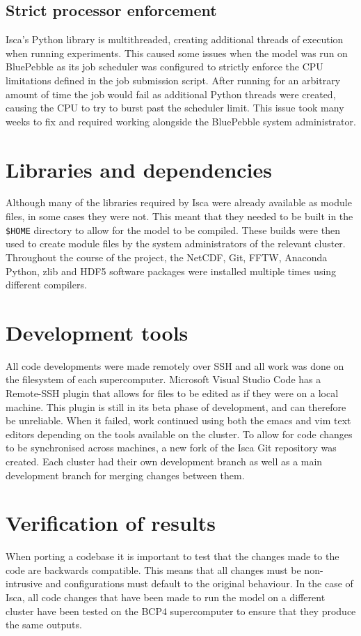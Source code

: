\documentclass[a4paper,11pt]{report}
\begin{document}
\subsection{Strict processor enforcement}
Isca's Python library is multithreaded, creating additional threads of execution when running experiments. This caused some issues when the model was run on BluePebble as its job scheduler was configured to strictly enforce the CPU limitations defined in the job submission script. After running for an arbitrary amount of time the job would fail as additional Python threads were created, causing the CPU to try to burst past the scheduler limit. This issue took many weeks to fix and required working alongside the BluePebble system administrator. 



\section{Libraries and dependencies}
Although many of the libraries required by Isca were already available as module files, in some cases they were not. This meant that they needed to be built in the \texttt{\$HOME} directory to allow for the model to be compiled. These builds were then used to create module files by the system administrators of the relevant cluster. Throughout the course of the project, the NetCDF, Git, FFTW, Anaconda Python, zlib and HDF5 software packages were installed multiple times using different compilers. 

\section{Development tools}
All code developments were made remotely over SSH and all work was done on the filesystem of each supercomputer. Microsoft Visual Studio Code has a Remote-SSH plugin that allows for files to be edited as if they were on a local machine. This plugin is still in its beta phase of development, and can therefore be unreliable. When it failed, work continued using both the emacs and vim text editors depending on the tools available on the cluster. To allow for code changes to be synchronised across machines, a new fork of the Isca Git repository was created. Each cluster had their own development branch as well as a main development branch for merging changes between them. 



\section{Verification of results}
When porting a codebase it is important to test that the changes made to the code are backwards compatible. This means that all changes must be non-intrusive and configurations must default to the original behaviour. In the case of Isca, all code changes that have been made to run the model on a different cluster have been tested on the BCP4 supercomputer to ensure that they produce the same outputs.
\end{document}
